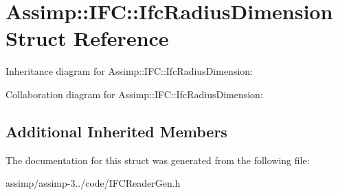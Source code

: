 \hypertarget{struct_assimp_1_1_i_f_c_1_1_ifc_radius_dimension}{\section{Assimp\+:\+:I\+F\+C\+:\+:Ifc\+Radius\+Dimension Struct Reference}
\label{struct_assimp_1_1_i_f_c_1_1_ifc_radius_dimension}
}


Inheritance diagram for Assimp\+:\+:I\+F\+C\+:\+:Ifc\+Radius\+Dimension\+:


Collaboration diagram for Assimp\+:\+:I\+F\+C\+:\+:Ifc\+Radius\+Dimension\+:
\subsection*{Additional Inherited Members}


The documentation for this struct was generated from the following file\+:\begin{DoxyCompactItemize}
\item 
assimp/assimp-\/3../code/I\+F\+C\+Reader\+Gen.\+h\end{DoxyCompactItemize}
